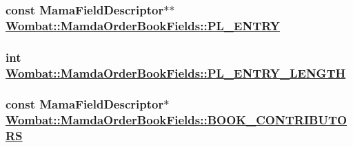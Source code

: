 \hypertarget{classWombat_1_1MamdaOrderBookFields_4e16493f242368a418ebf0d0edcee951}{
\subsubsection[PL\_\-ENTRY]{\setlength{\rightskip}{0pt plus 5cm}const Mama\-Field\-Descriptor$\ast$$\ast$ \hyperlink{classWombat_1_1MamdaOrderBookFields_4e16493f242368a418ebf0d0edcee951}{Wombat::Mamda\-Order\-Book\-Fields::PL\_\-ENTRY}}}
\label{classWombat_1_1MamdaOrderBookFields_4e16493f242368a418ebf0d0edcee951}


\hypertarget{classWombat_1_1MamdaOrderBookFields_314afa702237567d3d7e2e80df3a2f93}{
\subsubsection[PL\_\-ENTRY\_\-LENGTH]{\setlength{\rightskip}{0pt plus 5cm}int \hyperlink{classWombat_1_1MamdaOrderBookFields_314afa702237567d3d7e2e80df3a2f93}{Wombat::Mamda\-Order\-Book\-Fields::PL\_\-ENTRY\_\-LENGTH}}}
\label{classWombat_1_1MamdaOrderBookFields_314afa702237567d3d7e2e80df3a2f93}


\hypertarget{classWombat_1_1MamdaOrderBookFields_2a39ae0dbfa7955d4ecdd204234d75d2}{
\subsubsection[BOOK\_\-CONTRIBUTORS]{\setlength{\rightskip}{0pt plus 5cm}const Mama\-Field\-Descriptor$\ast$ \hyperlink{classWombat_1_1MamdaOrderBookFields_2a39ae0dbfa7955d4ecdd204234d75d2}{Wombat::Mamda\-Order\-Book\-Fields::BOOK\_\-CONTRIBUTORS}}}
\label{classWombat_1_1MamdaOrderBookFields_2a39ae0dbfa7955d4ecdd204234d75d2}


